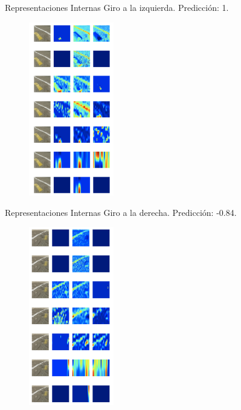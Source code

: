 \documentclass[10pt]{beamer}
\begin{document}
\begin{frame}{Representaciones Internas}
    Giro a la izquierda. Predicción: \alert{1}.
    \begin{figure}[!h] 
        \centering
        \includegraphics[width=0.33\textwidth]{../img/predizq}
    \end{figure}
\end{frame}

\begin{frame}{Representaciones Internas}
    Giro a la derecha. Predicción: \alert{-0.84}.
    \begin{figure}[!h] 
        \centering
        \includegraphics[width=0.33\textwidth]{../img/predder}
    \end{figure}
\end{frame}
\end{document}
